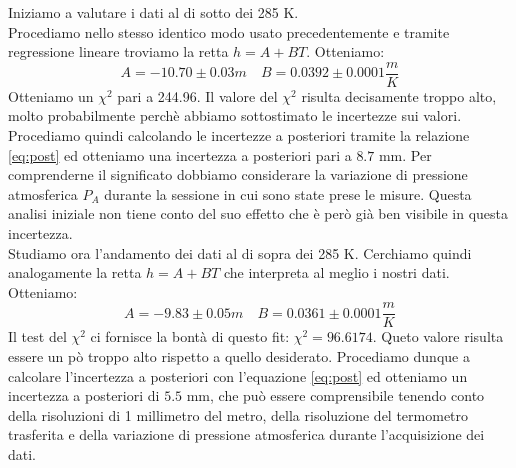 Iniziamo a valutare i dati al di sotto dei 285 K.\\
Procediamo nello stesso identico modo usato precedentemente e tramite regressione lineare troviamo la retta $h = A+BT$.
Otteniamo:
\[A = -10.70 \pm 0.03 m \quad  B = 0.0392 \pm 0.0001\frac{m}{K}\]
Otteniamo un $\chi^2$ pari a 244.96. 
Il valore del $\chi^2$ risulta decisamente troppo alto, molto probabilmente perchè abbiamo sottostimato le incertezze sui valori.
Procediamo quindi calcolando le incertezze a posteriori tramite la relazione \eqref{eq:post} ed otteniamo una incertezza a posteriori pari a $ 8.7 $ mm. 
Per comprenderne il significato dobbiamo considerare la variazione di pressione atmosferica $P_A$ durante la sessione in cui sono state prese le misure. 
Questa analisi iniziale non tiene conto del suo effetto che è però già ben visibile in questa incertezza.\\
\newline
Studiamo ora l'andamento dei dati al di sopra dei 285 K. 
Cerchiamo quindi analogamente la retta $h = A+BT$ che interpreta al meglio i nostri dati. 
Otteniamo:
\[A = -9.83 \pm 0.05 m \quad  B = 0.0361 \pm 0.0001\frac{m}{K}\]
Il test del $\chi^2$ ci fornisce la bontà di questo fit: $\chi^2 = 96.6174 $. 
Queto valore risulta essere un pò troppo alto rispetto a quello desiderato. 
Procediamo dunque a calcolare l'incertezza a posteriori con l'equazione \eqref{eq:post} ed otteniamo un incertezza a posteriori di $ 5.5 $ mm, che può essere comprensibile tenendo conto della risoluzioni di 1 millimetro del metro, della risoluzione del termometro trasferita e della variazione di pressione atmosferica durante l'acquisizione dei dati.

